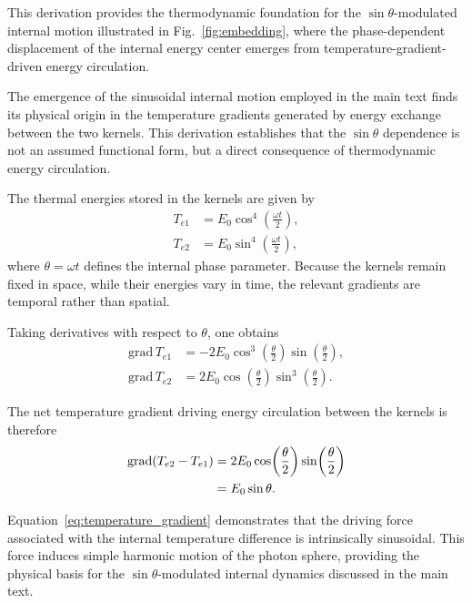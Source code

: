\documentclass[%
 reprint,
 amsmath,amssymb,
 aps,
 prb,
]{revtex4-2}
\numberwithin{equation}{section}
\begin{document}
This derivation provides the thermodynamic foundation for the $\sin\theta$-modulated internal motion illustrated in Fig.~\ref{fig:embedding}, where the phase-dependent displacement of the internal energy center emerges from temperature-gradient-driven energy circulation.

The emergence of the sinusoidal internal motion employed in the main text finds its physical origin in the temperature gradients generated by energy exchange between the two kernels. This derivation establishes that the $\sin\theta$ dependence is not an assumed functional form, but a direct consequence of thermodynamic energy circulation.

The thermal energies stored in the kernels are given by
\begin{align}
T_{e1} &= E_0 \cos^4\!\left(\frac{\omega t}{2}\right), \label{eq:kernel_A_energy}\\
T_{e2} &= E_0 \sin^4\!\left(\frac{\omega t}{2}\right), \label{eq:kernel_B_energy}
\end{align}
where $\theta = \omega t$ defines the internal phase parameter. Because the kernels remain fixed in space, while their energies vary in time, the relevant gradients are temporal rather than spatial.

Taking derivatives with respect to $\theta$, one obtains
\begin{align}
\mathrm{grad}\, T_{e1}
&= -2E_0 \cos^3\!\left(\frac{\theta}{2}\right)
      \sin\!\left(\frac{\theta}{2}\right), \label{eq:grad_Te1}\\
\mathrm{grad}\, T_{e2}
&=  2E_0 \cos\!\left(\frac{\theta}{2}\right)
      \sin^3\!\left(\frac{\theta}{2}\right). \label{eq:grad_Te2}
\end{align}

The net temperature gradient driving energy circulation between the kernels is therefore
\begin{align}
\mathrm{grad}(T_{e2}-T_{e1})
&= 2E_0 \cos\!\left(\frac{\theta}{2}\right)
       \sin\!\left(\frac{\theta}{2}\right) \notag\\
&= E_0 \sin\theta.
\label{eq:temperature_gradient}
\end{align}

Equation~\eqref{eq:temperature_gradient} demonstrates that the driving force associated with the internal temperature difference is intrinsically sinusoidal. This force induces simple harmonic motion of the photon sphere, providing the physical basis for the $\sin\theta$-modulated internal dynamics discussed in the main text.
\end{document}
